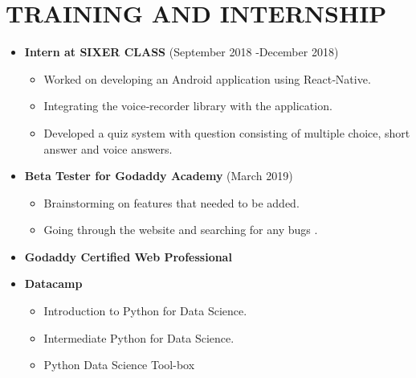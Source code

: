 \documentclass[paper=a4,fontsize=12pt]{scrartcl}
\newcommand{\NewPart}[1]{\section*{\uppercase{#1}}}
\begin{document}
\NewPart{Training and Internship}{}
\begin{itemize}
	\item \textbf{Intern at SIXER CLASS} (September 2018 ‐December 2018)	
	\begin{itemize}
		\item Worked on developing an Android application using React‐Native.   
		\item Integrating the voice‐recorder library with the application.
		\item Developed a quiz system with question consisting of multiple choice, short answer and voice answers. 
	\end{itemize}



	\item \textbf{Beta Tester for Godaddy Academy} (March 2019)	
	\begin{itemize}
		\item Brainstorming on features that needed to be added.   
		\item Going through the website and searching for any bugs .
	\end{itemize}

	\item \textbf{Godaddy Certified Web Professional}


	\item \textbf{Datacamp}	
	\begin{itemize}
		\item Introduction to Python for Data Science.   
		\item Intermediate Python for Data Science.
		\item Python Data Science Tool-box
	\end{itemize}
\end{itemize}
\end{document}
